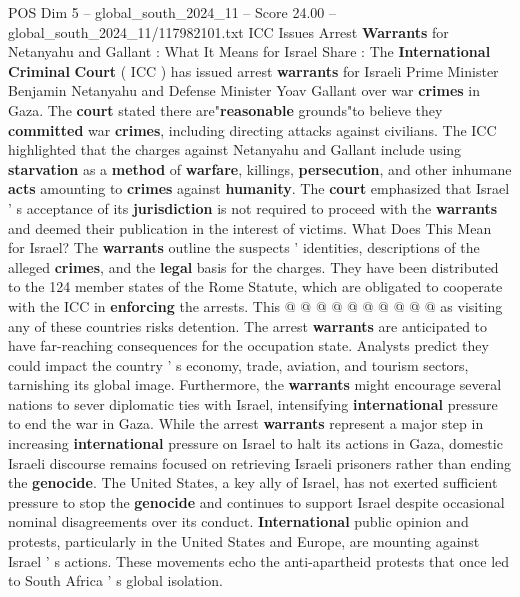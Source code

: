 \begin{textsample}{POS Dim 5 – global\_south\_2024\_11 – Score 24.00 – global\_south\_2024\_11/117982101.txt}  \label{ex:f5_pos_021}
ICC Issues Arrest \textbf{Warrants} for Netanyahu and Gallant : What It Means for Israel Share : The \textbf{International} \textbf{Criminal} \textbf{Court} ( ICC ) has issued arrest \textbf{warrants} for Israeli Prime Minister Benjamin Netanyahu and Defense Minister Yoav Gallant over war \textbf{crimes} in Gaza.
The \textbf{court} stated there are"\textbf{reasonable} grounds"to believe they \textbf{committed} war \textbf{crimes}, including directing attacks against civilians.
The ICC highlighted that the charges against Netanyahu and Gallant include using \textbf{starvation} as a \textbf{method} of \textbf{warfare}, killings, \textbf{persecution}, and other inhumane \textbf{acts} amounting to \textbf{crimes} against \textbf{humanity}.
The \textbf{court} emphasized that Israel ' s acceptance of its \textbf{jurisdiction} is not required to proceed with the \textbf{warrants} and deemed their publication in the interest of victims.
What Does This Mean for Israel?
The \textbf{warrants} outline the suspects ' identities, descriptions of the alleged \textbf{crimes}, and the \textbf{legal} basis for the charges.
They have been distributed to the 124 member states of the Rome Statute, which are obligated to cooperate with the ICC in \textbf{enforcing} the arrests.
This @ @ @ @ @ @ @ @ @ @ as visiting any of these countries risks detention.
The arrest \textbf{warrants} are anticipated to have far-reaching consequences for the occupation state.
Analysts predict they could impact the country ' s economy, trade, aviation, and tourism sectors, tarnishing its global image.
Furthermore, the \textbf{warrants} might encourage several nations to sever diplomatic ties with Israel, intensifying \textbf{international} pressure to end the war in Gaza.
While the arrest \textbf{warrants} represent a major step in increasing \textbf{international} pressure on Israel to halt its actions in Gaza, domestic Israeli discourse remains focused on retrieving Israeli prisoners rather than ending the \textbf{genocide}.
The United States, a key ally of Israel, has not exerted sufficient pressure to stop the \textbf{genocide} and continues to support Israel despite occasional nominal disagreements over its conduct. \textbf{International} public opinion and protests, particularly in the United States and Europe, are mounting against Israel ' s actions.
These movements echo the anti-apartheid protests that once led to South Africa ' s global isolation.

\end{textsample}
